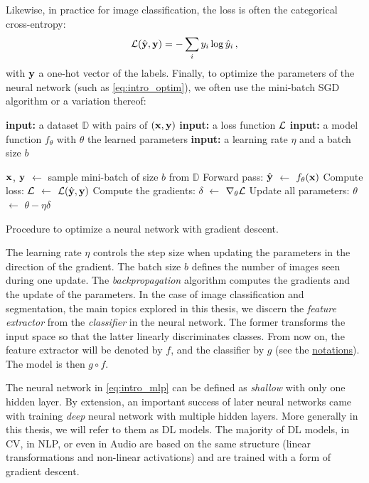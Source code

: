 Likewise, in practice for image classification, the loss is often the categorical cross-entropy:
%
\begin{equation}
      \mathcal{L}(\hat{\mathbf{y}}, \mathbf{y}) = -\sum_i y_i \log \hat{y}_i\,,
      \label{eq:intro_ce}
\end{equation}
%
\noindent with $\mathbf{y}$ a one-hot vector of the labels. Finally, to optimize the parameters of the neural
network (such as \autoref{eq:intro_optim}), we often use the mini-batch \ac{SGD} algorithm or a variation thereof:

\begin{algorithm}
      \begin{algorithmic}[1]
            \Statex \textbf{input:} a dataset $\mathbb{D}$ with pairs of $(\mathbf{x}, \mathbf{y})$
            \Statex \textbf{input:} a loss function $\mathcal{L}$
            \Statex \textbf{input:} a model function $f_\theta$ with $\theta$ the learned parameters
            \Statex \textbf{input:} a learning rate $\eta$ and a batch size $b$
            \Statex

            \State $\mathbf{x}$, $\mathbf{y}$ $\gets$ sample mini-batch of size $b$ from $\mathbb{D}$
            \State Forward pass: $\hat{\mathbf{y}}$ $\gets$ $f_\theta(\mathbf{x})$
            \State Compute loss: $\mathcal{L}$ $\gets$ $\mathcal{L}(\hat{\mathbf{y}}, \mathbf{y})$
            \State Compute the gradients: $\delta$ $\gets$ $\nabla_\theta \mathcal{L}$
            \State Update all parameters: $\theta$ $\gets$ $\theta - \eta \delta$
            \EndWhile
      \end{algorithmic}
      \caption{Procedure to optimize a neural network with gradient descent.}
      \label{algo:intro_sgd}
\end{algorithm}

The learning rate $\eta$ controls the step size when updating the parameters in the direction of the
gradient. The batch size $b$ defines the number of images seen during one update. The
\textit{backpropagation} algorithm \citep{rumelhart1986backprop} computes the gradients and the
update of the parameters. In the case of image classification and segmentation, the main topics
explored in this thesis, we discern the \textit{feature extractor} from the \textit{classifier} in
the neural network. The former transforms the input space so that the latter linearly discriminates
classes. From now on, the feature extractor will be denoted by $f$, and the classifier by $g$ (see
the \hyperref[chap:notations]{notations}). The model is then $g \circ f$.

The neural network in \autoref{eq:intro_mlp} can be defined as \textit{shallow} with only one hidden
layer. By extension, an important success of later neural networks came with training \textit{deep}
neural network with multiple hidden layers. More generally in this thesis, we will refer to them as
\acf{DL} models. The majority of \ac{DL} models, in \acf{CV}, in \acf{NLP}, or even in Audio are
based on the same structure (linear transformations and non-linear activations) and are trained with
a form of gradient descent.


